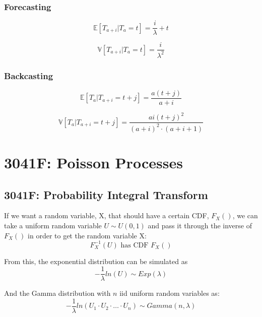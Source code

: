 \documentclass[12pt]{article}
\begin{document}
    \subsubsection{Forecasting}
    \begin{equation}
        \mathbb{E}[T_{a + i} | T_a = t] = \frac{i}{\lambda} + t
    \end{equation}

    \begin{equation}
        \mathbb{V}[T_{a + i} | T_a = t] = \frac{i}{\lambda^2}
    \end{equation}


    \subsubsection{Backcasting}
    \begin{equation}
        \mathbb{E}[T_a | T_{a + i} = t + j] = \frac{a(t + j)}{a + i}
    \end{equation}

    \begin{equation}
        \mathbb{V}[T_a | T_{a + i} = t + j] = 
        \frac{ ai(t + j)^2 }{ (a + i)^2 \cdot (a + i + 1) }
    \end{equation}
\section{3041F: Poisson Processes}
    \subsection{3041F: Probability Integral Transform}
    If we want a random variable, X, that should have a certain CDF, \(F_X()\),
    we can take a uniform random variable \(U \sim U(0, 1)\) and 
    pass it through the inverse of \(F_X()\) in order to get the random variable X:
    \begin{equation*}
        F_X^{-1}(U) \text{ has CDF } F_X()
    \end{equation*}


    From this, the exponential distribution can be simulated as 
    \begin{equation*}
        -\frac{1}{\lambda}ln(U) \sim Exp(\lambda)
    \end{equation*}

    And the Gamma distribution with \(n\) iid uniform random variables as:
    \begin{equation*}
        -\frac{1}{\lambda}ln(U_1 \cdot U_2 \cdot \dots \cdot U_n) \sim Gamma(n, \lambda)
    \end{equation*}
\end{document}
